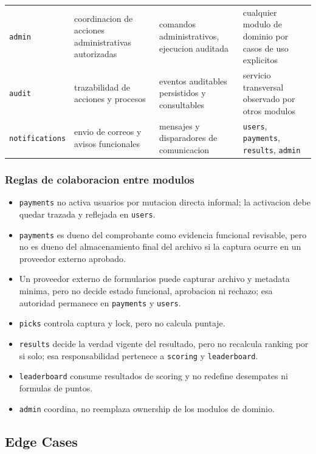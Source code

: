 \begin{longtable}{p{}p{}p{}p{}}
\texttt{admin} & coordinacion de acciones administrativas autorizadas & comandos administrativos, ejecucion auditada & cualquier modulo de dominio por casos de uso explicitos \\
\texttt{audit} & trazabilidad de acciones y procesos & eventos auditables persistidos y consultables & servicio transversal observado por otros modulos \\
\texttt{notifications} & envio de correos y avisos funcionales & mensajes y disparadores de comunicacion & \texttt{users}, \texttt{payments}, \texttt{results}, \texttt{admin} \\
\bottomrule
\end{longtable}

\subsubsection{Reglas de colaboracion entre modulos}

\begin{itemize}
  \item \texttt{payments} no activa usuarios por mutacion directa informal; la activacion debe quedar trazada y reflejada en \texttt{users}.
  \item \texttt{payments} es dueno del comprobante como evidencia funcional revisable, pero no es dueno del almacenamiento final del archivo si la captura ocurre en un proveedor externo aprobado.
  \item Un proveedor externo de formularios puede capturar archivo y metadata minima, pero no decide estado funcional, aprobacion ni rechazo; esa autoridad permanece en \texttt{payments} y \texttt{users}.
  \item \texttt{picks} controla captura y lock, pero no calcula puntaje.
  \item \texttt{results} decide la verdad vigente del resultado, pero no recalcula ranking por si solo; esa responsabilidad pertenece a \texttt{scoring} y \texttt{leaderboard}.
  \item \texttt{leaderboard} consume resultados de scoring y no redefine desempates ni formulas de puntos.
  \item \texttt{admin} coordina, no reemplaza ownership de los modulos de dominio.
\end{itemize}

\subsection{Edge Cases}

